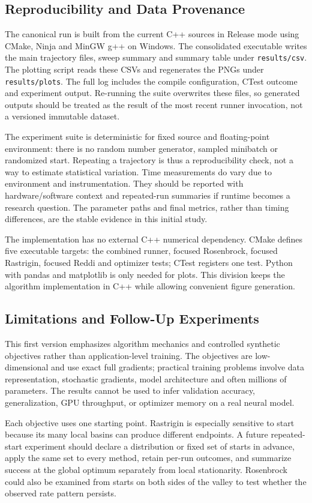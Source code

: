 ﻿\documentclass[conference]{IEEEtran}
\begin{document}
\subsection{Reproducibility and Data Provenance}
The canonical run is built from the current C++ sources in Release mode using CMake, Ninja and MinGW g++ on Windows. The consolidated executable writes the main trajectory files, sweep summary and summary table under \texttt{results/csv}. The plotting script reads these CSVs and regenerates the PNGs under \texttt{results/plots}. The full log includes the compile configuration, CTest outcome and experiment output. Re-running the suite overwrites these files, so generated outputs should be treated as the result of the most recent runner invocation, not a versioned immutable dataset.

The experiment suite is deterministic for fixed source and floating-point environment: there is no random number generator, sampled minibatch or randomized start. Repeating a trajectory is thus a reproducibility check, not a way to estimate statistical variation. Time measurements do vary due to environment and instrumentation. They should be reported with hardware/software context and repeated-run summaries if runtime becomes a research question. The parameter paths and final metrics, rather than timing differences, are the stable evidence in this initial study.

The implementation has no external C++ numerical dependency. CMake defines five executable targets: the combined runner, focused Rosenbrock, focused Rastrigin, focused Reddi and optimizer tests; CTest registers one test. Python with pandas and matplotlib is only needed for plots. This division keeps the algorithm implementation in C++ while allowing convenient figure generation.
\subsection{Limitations and Follow-Up Experiments}
This first version emphasizes algorithm mechanics and controlled synthetic objectives rather than application-level training. The objectives are low-dimensional and use exact full gradients; practical training problems involve data representation, stochastic gradients, model architecture and often millions of parameters. The results cannot be used to infer validation accuracy, generalization, GPU throughput, or optimizer memory on a real neural model.

Each objective uses one starting point. Rastrigin is especially sensitive to start because its many local basins can produce different endpoints. A future repeated-start experiment should declare a distribution or fixed set of starts in advance, apply the same set to every method, retain per-run outcomes, and summarize success at the global optimum separately from local stationarity. Rosenbrock could also be examined from starts on both sides of the valley to test whether the observed rate pattern persists.
\end{document}
